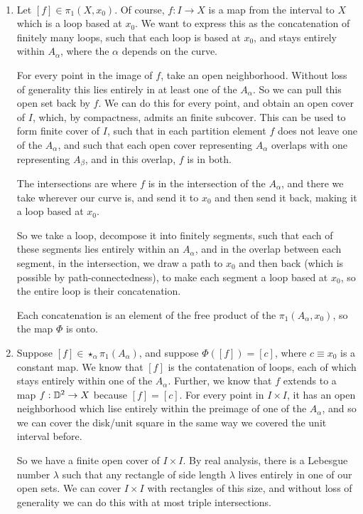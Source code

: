 \documentclass[x11names,reqno,14pt]{extarticle}
\begin{document}
\proof\,

\begin{enumerate}

\item Let $[f]\in\pi_1(X, x_0)$. Of course, $f:I\to X$ is a map from the interval to $X$ which is a loop based at $x_0$. We want to express this as the concatenation of finitely many loops, such that each loop is based at $x_0$, and stays entirely within $A_\alpha$, where the $\alpha$ depends on the curve. 

For every point in the image of $f$, take an open neighborhood. Without loss of generality this lies entirely in at least one of the $A_\alpha$. So we can pull this open set back by $f$. We can do this for every point, and obtain an open cover of $I$, which, by compactness, admits an finite subcover. This can be used to form finite cover of $I$, such that in each partition element $f$ does not leave one of the $A_\alpha$, and such that each open cover representing $A_\alpha$ overlaps with one representing $A_\beta$, and in this overlap, $f$ is in both. 

The intersections are where $f$ is in the intersection of the $A_\alpha$, and there we take wherever our curve is, and send it to $x_0$ and then send it back, making it a loop based at $x_0$. 

So we take a loop, decompose it into finitely segments, such that each of these segments lies entirely within an $A_\alpha$, and in the overlap between each segment, in the intersection, we draw a path to $x_0$ and then back (which is possible by path-connectedness), to make each segment a loop based at $x_0$, so the entire loop is their concatenation. 

Each concatenation is an element of the free product of the $\pi_1(A_\alpha, x_0)$, so the map $\Phi$ is onto. 

\item Suppose $[f]\in\star_\alpha\pi_1(A_\alpha)$, and suppose $\Phi([f]) = [c]$, where $c\equiv x_0$ is a constant map. We know that $[f]$ is the contatenation of loops, each of which stays entirely within one of the $A_\alpha$. Further, we know that $f$ extends to a map $f:\mathbb{D}^2\to X$ because $[f] = [c]$. For every point in $I\times I$, it has an open neighborhood which lise entirely within the preimage of one of the $A_\alpha$, and so we can cover the disk/unit square in the same way we covered the unit interval before. 

So we have a finite open cover of $I\times I$. By real analysis, there is a Lebesgue number $\lambda$ such that any rectangle of side length $\lambda$ lives entirely in one of our open sets. We can cover $I\times I$ with rectangles of this size, and without loss of generality we can do this with at most triple intersections. 


\end{enumerate}
\end{document}
